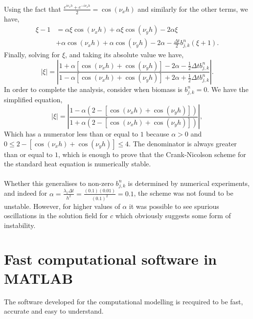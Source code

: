 Using the fact that $ \frac{e^{i \nu_x h}+  e^{-i \nu_x h}}{2} = \cos(\nu_x h)$ and similarly for
the other terms, we have,
\begin{equation*}
    \begin{split}
        \xi - 1 &=
         \alpha \xi \cos(\nu_x h) 
       + \alpha \xi \cos(\nu_y h) 
       -2 \alpha \xi   \\
       &+\alpha \cos(\nu_x h) 
       + \alpha \cos(\nu_y h) 
       -2 \alpha
       -\frac{\Delta t}{2} b_{j,k}^{n} (\xi + 1).
    \end{split}
\end{equation*}
Finally, solving for $\xi$, and taking its absolute value we have,
\begin{equation*}
    |\xi| = \left| \frac{1 + \alpha \left[ \cos(\nu_x h) + \cos(\nu_y h) \right] - 2 \alpha -\frac{1}{2} \Delta t b_{j,k}^{n} }
                        {1 -\alpha \left[ \cos(\nu_x h) + \cos(\nu_y h) \right]  + 2 \alpha +\frac{1}{2} \Delta t b_{j,k}^{n}} \right|.
\end{equation*}
In order to complete the analysis, consider when biomass is $b_{j,k}^{n} = 0$. We have the simplified
equation,
\begin{equation*}
    |\xi| = \left| \frac{1 -\alpha(2 - \left[ \cos(\nu_x h) + \cos(\nu_y h) \right]) }
                        {1 +\alpha(2 - \left[ \cos(\nu_x h) + \cos(\nu_y h)\right])} \right|,
\end{equation*}
Which has a numerator less than or equal to $1$ because $\alpha > 0$ and 
$0 \leq 2 - \left[ \cos(\nu_x h) + \cos(\nu_y h) \right] \leq 4$. The denominator is 
always greater than or equal to $1$, which is enough to prove that
the Crank-Nicolson scheme for the standard heat equation is numerically stable.
\\
\\
Whether this generalises to non-zero $b_{j,k}^{n}$ is determined by numerical experiments, and 
indeed for $\alpha = \frac{\lambda_1 \Delta t}{h^2} = \frac{(0.1) (0.01)}{(0.1)^2} = 0.1$, the scheme 
was not found to be unstable. However, for higher values of $\alpha$ it was possible to see spurious 
oscillations in the solution field for $c$ which obviously suggests some form of instability.

\section{ Fast computational software in MATLAB }
The software developed for the computational modelling is recquired
to be fast, accurate and easy to understand.









